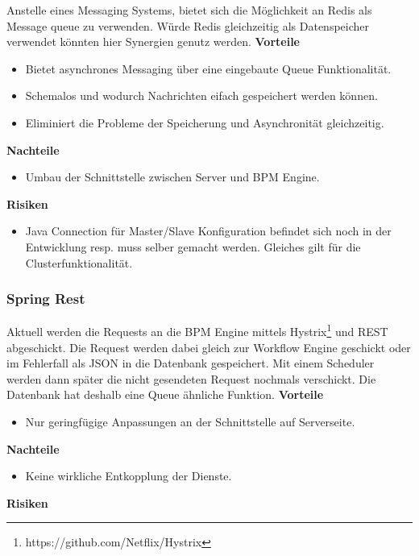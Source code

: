 Anstelle eines Messaging Systems, bietet sich die Möglichkeit an Redis als Message queue zu verwenden. Würde Redis gleichzeitig als Datenspeicher verwendet könnten hier Synergien genutz werden. 
\newline
\newline
\textbf{Vorteile}
\begin{itemize}
	\item Bietet asynchrones Messaging über eine eingebaute Queue Funktionalität.
	\item Schemalos und wodurch Nachrichten eifach gespeichert werden können.
	\item Eliminiert die Probleme der Speicherung und Asynchronität gleichzeitig.
\end{itemize}
\textbf{Nachteile}
\begin{itemize}
	\item Umbau der Schnittstelle zwischen Server und BPM Engine.
\end{itemize}
\textbf{Risiken}
\begin{itemize}
	\item Java Connection für Master/Slave Konfiguration befindet sich noch in der Entwicklung resp. muss selber gemacht werden. Gleiches gilt für die Clusterfunktionalität.
\end{itemize}

\subsubsection{Spring Rest}

Aktuell werden die Requests an die BPM Engine mittels Hystrix\footnote{https://github.com/Netflix/Hystrix} und \gls{REST} abgeschickt. Die Request werden dabei gleich zur Workflow Engine geschickt oder im Fehlerfall als JSON in die Datenbank gespeichert. Mit einem Scheduler werden dann später die nicht gesendeten Request nochmals verschickt. Die Datenbank hat deshalb eine Queue ähnliche Funktion.
\newline
\newline
\textbf{Vorteile}
\begin{itemize}
	\item Nur geringfügige Anpassungen an der Schnittstelle auf Serverseite.
\end{itemize}
\textbf{Nachteile}
\begin{itemize}
	\item Keine wirkliche Entkopplung der Dienste.
\end{itemize}
\textbf{Risiken}

